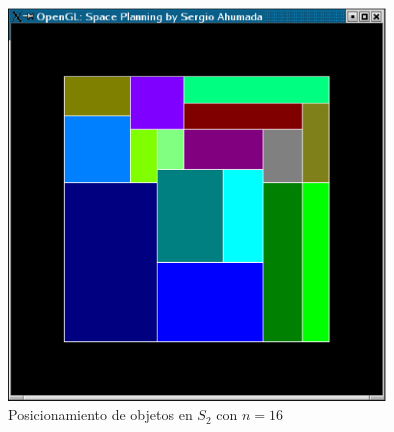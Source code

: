 \documentclass[letterpaper,12pt]{article}
\begin{document}
\pagestyle{empty}
\thispagestyle{empty}

\noindent

\begin{figure}
 \centering\includegraphics[width=10cm]{salida-16.eps}
 \caption{Posicionamiento de objetos en $S_2$ con $n=16$}
\end{figure}
  
\end{document}

